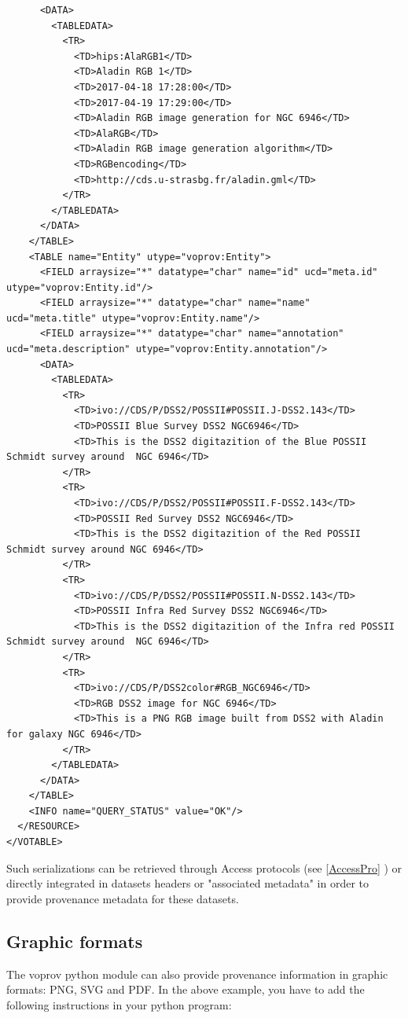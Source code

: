 \begin{verbatim}
      <DATA>
        <TABLEDATA>
          <TR>
            <TD>hips:AlaRGB1</TD>
            <TD>Aladin RGB 1</TD>
            <TD>2017-04-18 17:28:00</TD>
            <TD>2017-04-19 17:29:00</TD>
            <TD>Aladin RGB image generation for NGC 6946</TD>
            <TD>AlaRGB</TD>
            <TD>Aladin RGB image generation algorithm</TD>
            <TD>RGBencoding</TD>
            <TD>http://cds.u-strasbg.fr/aladin.gml</TD>
          </TR>
        </TABLEDATA>
      </DATA>
    </TABLE>
    <TABLE name="Entity" utype="voprov:Entity">
      <FIELD arraysize="*" datatype="char" name="id" ucd="meta.id" utype="voprov:Entity.id"/>
      <FIELD arraysize="*" datatype="char" name="name" ucd="meta.title" utype="voprov:Entity.name"/>
      <FIELD arraysize="*" datatype="char" name="annotation" ucd="meta.description" utype="voprov:Entity.annotation"/>
      <DATA>
        <TABLEDATA>
          <TR>
            <TD>ivo://CDS/P/DSS2/POSSII#POSSII.J-DSS2.143</TD>
            <TD>POSSII Blue Survey DSS2 NGC6946</TD>
            <TD>This is the DSS2 digitazition of the Blue POSSII Schmidt survey around  NGC 6946</TD>
          </TR>
          <TR>
            <TD>ivo://CDS/P/DSS2/POSSII#POSSII.F-DSS2.143</TD>
            <TD>POSSII Red Survey DSS2 NGC6946</TD>
            <TD>This is the DSS2 digitazition of the Red POSSII Schmidt survey around NGC 6946</TD>
          </TR>
          <TR>
            <TD>ivo://CDS/P/DSS2/POSSII#POSSII.N-DSS2.143</TD>
            <TD>POSSII Infra Red Survey DSS2 NGC6946</TD>
            <TD>This is the DSS2 digitazition of the Infra red POSSII Schmidt survey around  NGC 6946</TD>
          </TR>
          <TR>
            <TD>ivo://CDS/P/DSS2color#RGB_NGC6946</TD>
            <TD>RGB DSS2 image for NGC 6946</TD>
            <TD>This is a PNG RGB image built from DSS2 with Aladin for galaxy NGC 6946</TD>
          </TR>
        </TABLEDATA>
      </DATA>
    </TABLE>
    <INFO name="QUERY_STATUS" value="OK"/>
  </RESOURCE>
</VOTABLE>

\end{verbatim}
  
Such serializations can be retrieved through Access protocols (see \ref{AccessPro} ) or directly integrated in datasets headers or "associated metadata" in order to provide provenance metadata for these datasets. 

\subsection{Graphic formats}
\label{Graphics}
The voprov python module can also provide provenance information in graphic formats: PNG, SVG and PDF.
In the above example, you have to add the following instructions in your python program:

